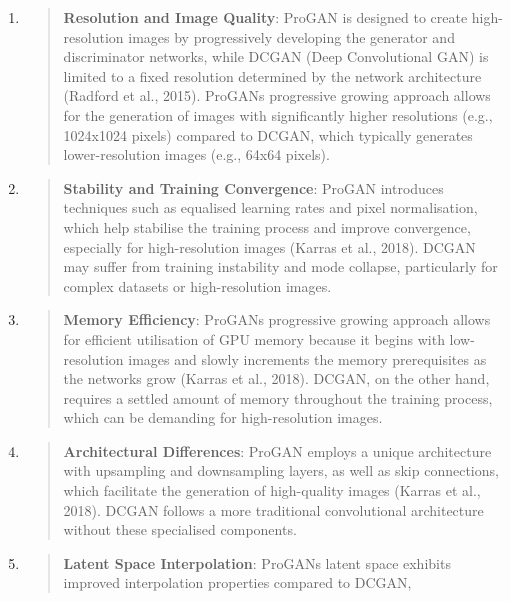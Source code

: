 \documentclass[
]{article}
\begin{document}
\begin{enumerate}
\def\labelenumi{\arabic{enumi}.}
\item
  \begin{quote}
  \textbf{Resolution and Image Quality}: ProGAN is designed to create
  high-resolution images by progressively developing the generator and
  discriminator networks, while DCGAN (Deep Convolutional GAN) is
  limited to a fixed resolution determined by the network architecture
  (Radford et al., 2015). ProGAN\textquotesingle s progressive growing
  approach allows for the generation of images with significantly higher
  resolutions (e.g., 1024x1024 pixels) compared to DCGAN, which
  typically generates lower-resolution images (e.g., 64x64 pixels).
  \end{quote}
\item
  \begin{quote}
  \textbf{Stability and Training Convergence}: ProGAN introduces
  techniques such as equalised learning rates and pixel normalisation,
  which help stabilise the training process and improve convergence,
  especially for high-resolution images (Karras et al., 2018). DCGAN may
  suffer from training instability and mode collapse, particularly for
  complex datasets or high-resolution images.
  \end{quote}
\item
  \begin{quote}
  \textbf{Memory Efficiency}: ProGAN\textquotesingle s progressive
  growing approach allows for efficient utilisation of GPU memory
  because it begins with low-resolution images and slowly increments the
  memory prerequisites as the networks grow (Karras et al., 2018).
  DCGAN, on the other hand, requires a settled amount of memory
  throughout the training process, which can be demanding for
  high-resolution images.
  \end{quote}
\item
  \begin{quote}
  \textbf{Architectural Differences}: ProGAN employs a unique
  architecture with upsampling and downsampling layers, as well as skip
  connections, which facilitate the generation of high-quality images
  (Karras et al., 2018). DCGAN follows a more traditional convolutional
  architecture without these specialised components.
  \end{quote}
\item
  \begin{quote}
  \textbf{Latent Space Interpolation}: ProGAN\textquotesingle s latent
  space exhibits improved interpolation properties compared to DCGAN,

\end{quote}
\end{enumerate}
\end{document}
